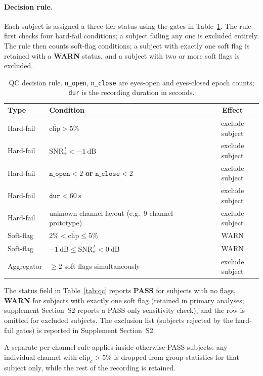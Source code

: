 \documentclass[10pt,a4paper]{article}
\begin{document}
\paragraph{Decision rule.} Each subject is assigned a three-tier status using the gates in Table~\ref{tab:qc_rule}. The rule first checks four hard-fail conditions; a subject failing
 any one is excluded entirely. The rule then counts soft-flag conditions; a subject with exactly one soft flag is retained with a \textbf{WARN} status, and a subject with two or more
 soft flags is excluded.

\begin{table}[H]
\caption{QC decision rule. \texttt{n\_open}, \texttt{n\_close} are eyes-open and eyes-closed epoch counts; \texttt{dur} is the recording duration in seconds.}
\label{tab:qc_rule}
\centering\small
\begin{tabular}{llc}
\toprule
\textbf{Type} & \textbf{Condition} & \textbf{Effect} \\
\midrule
Hard-fail  & $\overline{\mathrm{clip}} > 5\%$ & exclude subject \\
Hard-fail  & $\overline{\mathrm{SNR}_{\alpha}^{\,t}} < -1\ \mathrm{dB}$ & exclude subject \\
Hard-fail  & $\texttt{n\_open} < 2$ \;\textbf{or}\; $\texttt{n\_close} < 2$ & exclude subject \\
Hard-fail  & $\texttt{dur} < 60\ \mathrm{s}$ & exclude subject \\
Hard-fail  & unknown channel-layout (e.g.\ 9-channel prototype) & exclude subject \\
\midrule
Soft-flag  & $2\% < \overline{\mathrm{clip}} \le 5\%$ & WARN \\
Soft-flag  & $-1\ \mathrm{dB} \le \overline{\mathrm{SNR}_{\alpha}^{\,t}} < 0\ \mathrm{dB}$ & WARN \\
\midrule
Aggregator & $\ge 2$ soft flags simultaneously & exclude subject \\
\bottomrule
\end{tabular}
\end{table}

The status field in Table~\ref{tab:qc} reports \textbf{PASS} for subjects with no flags, \textbf{WARN} for subjects with exactly one soft flag (retained in primary analyses;
supplement Section~S2 reports a PASS-only sensitivity check), and the row is omitted for excluded subjects. The exclusion list (subjects rejected by the hard-fail gates) is reported
in Supplement Section~S2.

A separate per-channel rule applies inside otherwise-PASS subjects: any individual channel with $\mathrm{clip}_{c}>5\%$ is dropped from group statistics for that subject only, while
the rest of the recording is retained.
\end{document}
